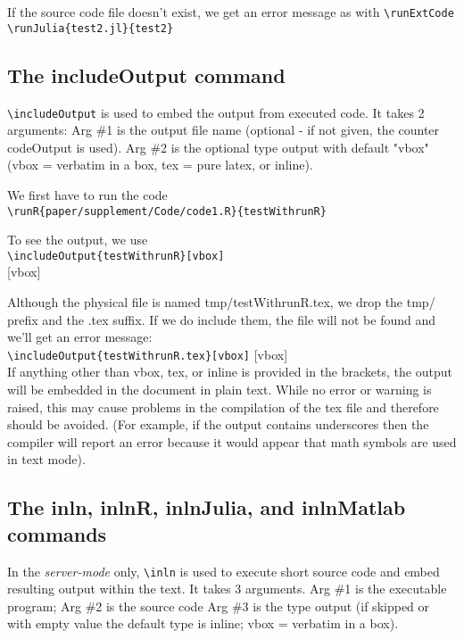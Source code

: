 \documentclass[a4paper,10pt]{article}
\begin{document}
If the source code file doesn't exist, we get an error message as with \verb|\runExtCode|\\
\verb|\runJulia{test2.jl}{test2}|\\



\subsection*{The includeOutput command}
\verb|\includeOutput| is used to embed the output from executed code. It takes 2 arguments:
Arg \#1 is the output file name (optional - if not given, the counter codeOutput is used).
Arg \#2 is the optional type output with default "vbox" (vbox = verbatim in a box, tex = pure latex, or inline).

We first have to run the code\\
\verb|\runR{paper/supplement/Code/code1.R}{testWithrunR}|

To see the output, we use\\
\verb|\includeOutput{testWithrunR}[vbox]|\\
[vbox]

Although the physical file is named tmp/testWithrunR.tex, we drop the tmp/ prefix and the .tex suffix. If we do include them, the file will not be found and we'll get an error message:\\
\verb|\includeOutput{testWithrunR.tex}[vbox]|
[vbox]\\

If anything other than vbox, tex, or inline is provided in the brackets, the output will be embedded in the document in plain text. While no error or warning is raised, this may cause problems in the compilation of the tex file and therefore should be avoided. (For example, if the output contains underscores then the compiler will report an error because it would appear that math symbols are used in text mode).


\subsection*{The inln, inlnR, inlnJulia, and inlnMatlab commands}
In the \textit{server-mode} only, \verb|\inln| is used to execute short source code and embed resulting output within the text. It takes 3 arguments.
Arg \#1 is the executable program;
Arg \#2 is the source code
Arg \#3 is the type output (if skipped or with empty value the default type is inline; vbox = verbatim in a box).
\end{document}
